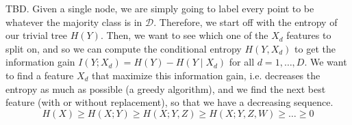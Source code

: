   \begin{algo}
    TBD. Given a single node, we are simply going to label every point to be whatever the majority class is in $\mathcal{D}$. Therefore, we start off with the entropy of our trivial tree $H(Y)$. Then, we want to see which one of the $X_d$ features to split on, and so we can compute the conditional entropy $H(Y, X_d)$ to get the information gain $I(Y; X_d) = H(Y) - H(Y \mid X_d)$ for all $d = 1, \ldots, D$. We want to find a feature $X_d$ that maximize this information gain, i.e. decreases the entropy as much as possible (a greedy algorithm), and we find the next best feature (with or without replacement), so that we have a decreasing sequence. 
    \begin{equation}
      H(X) \geq H(X ; Y) \geq H(X ; Y, Z) \geq H(X ; Y, Z, W) \geq \ldots \geq 0
    \end{equation}
  \end{algo}

